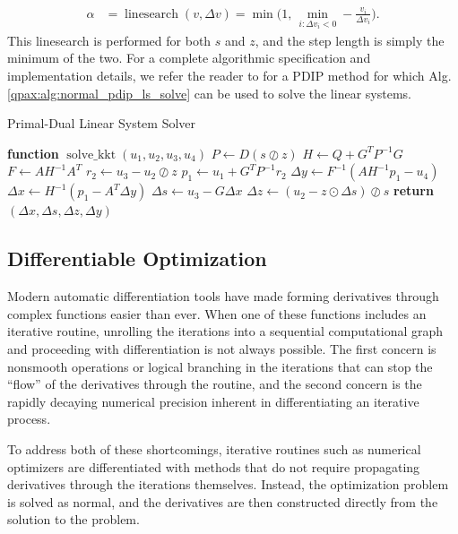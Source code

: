 \begin{align}
    \alpha &= \operatorname{linesearch}(v, \Delta v) = \min \bigg( 1,\, \min_{i:\Delta v_i < 0} -\frac{v_i}{\Delta v_i} \bigg) .\label{qpax:sec:background:linesearch}
\end{align}
%
This linesearch is performed for both $s$ and $z$, and the step length is simply the minimum of the two. For a complete algorithmic specification and implementation details, we refer the reader to \cite{mattingley2012} for a PDIP method for which Alg. \eqref{qpax:alg:normal_pdip_ls_solve} can be used to solve the linear systems.
%
\begin{algorithm}
\caption{Primal-Dual Linear System Solver}\label{qpax:alg:normal_pdip_ls_solve}
\begin{algorithmic}[1]
\State \textbf{function} $\operatorname{solve\_kkt}(u_1, u_2, u_3, u_4)$ 
\State $P \gets D(s \oslash  z)$ %
\State $H \gets Q + G^TP^{-1}G$ 
\State $F \gets A H^{-1} A^T$  
\State $r_2 \gets u_3 - u_2 \oslash z$
\State $p_1 \gets u_1 + G^T P^{-1}r_2$
\State $\Delta y \gets F^{-1}(A H^{-1}p_1 - u_4)$
\State $\Delta x \gets H^{-1}(p_1 - A^T\Delta y)$
\State $\Delta s \gets u_3 - G \Delta x$
\State $\Delta z \gets (u_2 - z \odot \Delta s) \oslash s$
\State \textbf{return} $(\Delta x, \Delta s, \Delta z, \Delta y)$
\end{algorithmic}
\end{algorithm}
%
%
\subsection{Differentiable Optimization}
Modern automatic differentiation tools have made forming derivatives through complex functions easier than ever. When one of these functions includes an iterative routine, unrolling the iterations into a sequential computational graph and proceeding with differentiation is not always possible. The first concern is nonsmooth operations or logical branching in the iterations that can stop the ``flow'' of the derivatives through the routine, and the second concern is the rapidly decaying numerical precision inherent in differentiating an iterative process.

To address both of these shortcomings, iterative routines such as numerical optimizers are differentiated with methods that do not require propagating derivatives through the iterations themselves. Instead, the optimization problem is solved as normal, and the derivatives are then constructed directly from the solution to the problem.
%
%
